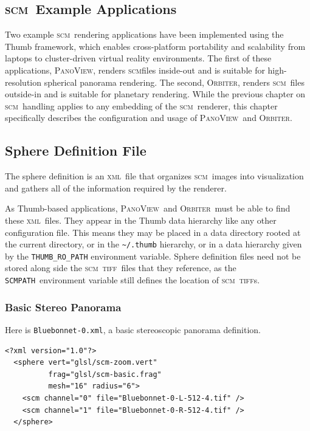 \documentclass[oneside,10pt]{memoir}
\newcommand{\scm}     {\textsc{scm}}
\newcommand{\tiff}    {\textsc{tiff}}
\newcommand{\xml}     {\textsc{xml}}
\newcommand{\scmpath}{\texttt{SCMPATH}}
\newcommand{\panoview}{\textsc{PanoView}}
\newcommand{\orbiter} {\textsc{Orbiter}}
\begin{document}
\begin{Spacing}{1.1}

\chapter{\scm\ Example Applications}

Two example \scm\ rendering applications have been implemented using the Thumb framework, which enables cross-platform portability and scalability from laptops to cluster-driven virtual reality environments. The first of these applications, \panoview, renders \scm files inside-out and is suitable for high-resolution spherical panorama rendering. The second, \orbiter, renders \scm\ files outside-in and is suitable for planetary rendering. While the previous chapter on \scm\ handling applies to any embedding of the \scm\ renderer, this chapter specifically describes the configuration and usage of \panoview\ and \orbiter.

\section{Sphere Definition File}

The sphere definition is an \xml\ file that organizes \scm\ images into visualization and gathers all of the information required by the renderer.

As Thumb-based applications, \panoview\ and \orbiter\ must be able to find these \xml\ files. They appear in the Thumb data hierarchy like any other configuration file. This means they may be placed in a data directory rooted at the current directory, or in the \texttt{\textasciitilde/.thumb} hierarchy, or in a data hierarchy given by the \verb|THUMB_RO_PATH| environment variable. Sphere definition files need not be stored along side the \scm\ \tiff\ files that they reference, as the \scmpath\ environment variable still defines the location of \scm\ \tiff s.

\subsection{Basic Stereo Panorama}

Here is \texttt{Bluebonnet-0.xml}, a basic stereoscopic panorama definition.

\begin{Verbatim}
<?xml version="1.0"?>
  <sphere vert="glsl/scm-zoom.vert"
          frag="glsl/scm-basic.frag"
          mesh="16" radius="6">
    <scm channel="0" file="Bluebonnet-0-L-512-4.tif" />
    <scm channel="1" file="Bluebonnet-0-R-512-4.tif" />
  </sphere>
\end{Verbatim}


\end{Spacing}
\end{document}
